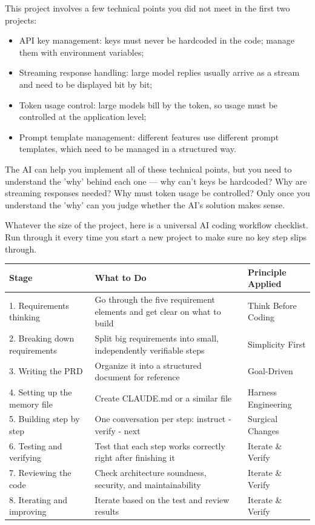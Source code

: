 
This project involves a few technical points you did not meet in the first two projects:

\begin{itemize}
  \item API key management: keys must never be hardcoded in the code; manage them with environment variables;
  \item Streaming response handling: large model replies usually arrive as a stream and need to be displayed bit by bit;
  \item Token usage control: large models bill by the token, so usage must be controlled at the application level;
  \item Prompt template management: different features use different prompt templates, which need to be managed in a structured way.
\end{itemize}

The AI can help you implement all of these technical points, but you need to understand the 'why' behind each one — why can't keys be hardcoded? Why are streaming responses needed? Why must token usage be controlled? Only once you understand the 'why' can you judge whether the AI's solution makes sense.


Whatever the size of the project, here is a universal AI coding workflow checklist. Run through it every time you start a new project to make sure no key step slips through.

\begin{center}
\begin{tabularx}{\linewidth}{|X|X|X|}
\hline
\textbf{Stage} & \textbf{What to Do} & \textbf{Principle Applied} \tabularnewline
\hline
1. Requirements thinking & Go through the five requirement elements and get clear on what to build & Think Before Coding \tabularnewline
2. Breaking down requirements & Split big requirements into small, independently verifiable steps & Simplicity First \tabularnewline
3. Writing the PRD & Organize it into a structured document for reference & Goal-Driven \tabularnewline
4. Setting up the memory file & Create CLAUDE.md or a similar file & Harness Engineering \tabularnewline
5. Building step by step & One conversation per step: instruct - verify - next & Surgical Changes \tabularnewline
6. Testing and verifying & Test that each step works correctly right after finishing it & Iterate \& Verify \tabularnewline
7. Reviewing the code & Check architecture soundness, security, and maintainability & Iterate \& Verify \tabularnewline
8. Iterating and improving & Iterate based on the test and review results & Iterate \& Verify \tabularnewline
\hline
\end{tabularx}
\end{center}

